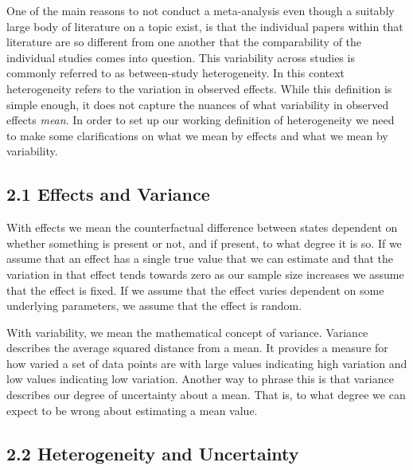 \documentclass[
  letterpaper,
  DIV=11,
  numbers=noendperiod]{scrartcl}
\begin{document}
One of the main reasons to not conduct a meta-analysis even though a
suitably large body of literature on a topic exist, is that the
individual papers within that literature are so different from one
another that the comparability of the individual studies comes into
question. This variability across studies is commonly referred to as
between-study heterogeneity. In this context heterogeneity refers to the
variation in observed effects. While this definition is simple enough,
it does not capture the nuances of what variability in observed effects
\emph{mean}. In order to set up our working definition of heterogeneity
we need to make some clarifications on what we mean by effects and what
we mean by variability.

\hypertarget{effects-and-variance}{%
\subsection{2.1 Effects and Variance}\label{effects-and-variance}}

With effects we mean the counterfactual difference between states
dependent on whether something is present or not, and if present, to
what degree it is so. If we assume that an effect has a single true
value that we can estimate and that the variation in that effect tends
towards zero as our sample size increases we assume that the effect is
fixed. If we assume that the effect varies dependent on some underlying
parameters, we assume that the effect is random.

With variability, we mean the mathematical concept of variance. Variance
describes the average squared distance from a mean. It provides a
measure for how varied a set of data points are with large values
indicating high variation and low values indicating low variation.
Another way to phrase this is that variance describes our degree of
uncertainty about a mean. That is, to what degree we can expect to be
wrong about estimating a mean value.

\hypertarget{heterogeneity-and-uncertainty}{%
\subsection{2.2 Heterogeneity and
Uncertainty}\label{heterogeneity-and-uncertainty}}
\end{document}
